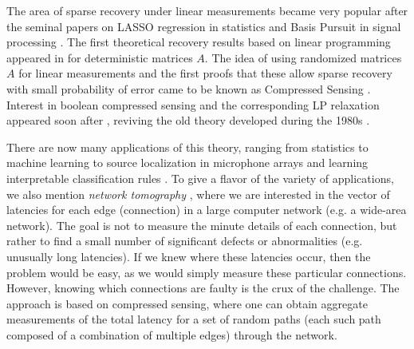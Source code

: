 The area of sparse recovery under linear measurements became very popular after the seminal 
papers on LASSO regression \cite{tibshirani1996regression} in statistics and Basis Pursuit in signal processing 
\cite{basis_pursuit}. The first theoretical recovery results based on linear programming appeared in 
\cite{donoho2001uncertainty} for deterministic matrices $A$.  The idea of using randomized matrices $A$ for linear measurements and the first proofs that these allow sparse recovery with small probability of error came to be known as Compressed Sensing \cite{donoho2006compressed}. Interest in boolean compressed sensing and the corresponding LP relaxation appeared soon after \cite{atia2012boolean, malioutov2012boolean}, reviving the old theory developed during the 1980s \cite{Malyutov78}.

There are now many applications of this theory, ranging from statistics to machine 
learning to source localization in microphone arrays \cite{malioutov2005sparse} and learning
interpretable classification rules \cite{malioutov2013exact}. To give
a flavor of the variety of applications, we also mention {\em network tomography} \cite{vardi1996network_tomography}, where we are interested in the vector of latencies for each edge (connection) in a large
computer network (e.g. a wide-area network). The goal is not to measure the minute details of each connection, but rather to find a small number of significant defects or abnormalities (e.g. unusually long latencies). If we knew where these latencies occur, then the problem would be easy, as we would simply measure these particular connections. However, knowing which connections are faulty is the crux of the challenge. The approach is based on compressed sensing, where one can obtain aggregate measurements of the total latency for a set of random paths (each such path composed of a combination of multiple edges) through the network.
